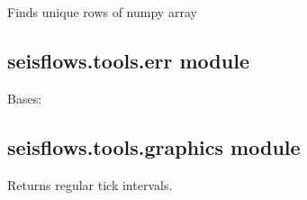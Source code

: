 \documentclass[letterpaper,10pt,english]{sphinxmanual}
\begin{document}
\begin{fulllineitems}
\label{\detokenize{ref/seisflows.tools:seisflows.tools.array.uniquerows}}
Finds unique rows of numpy array

\end{fulllineitems}



\subsection{seisflows.tools.err module}
\label{\detokenize{ref/seisflows.tools:module-seisflows.tools.err}}\label{\detokenize{ref/seisflows.tools:seisflows-tools-err-module}}

\begin{fulllineitems}
\label{\detokenize{ref/seisflows.tools:seisflows.tools.err.ParameterError}}
Bases: 

\end{fulllineitems}



\subsection{seisflows.tools.graphics module}
\label{\detokenize{ref/seisflows.tools:module-seisflows.tools.graphics}}\label{\detokenize{ref/seisflows.tools:seisflows-tools-graphics-module}}

\begin{fulllineitems}
\label{\detokenize{ref/seisflows.tools:seisflows.tools.graphics.get_regular_ticks}}
Returns regular tick intervals.

\end{fulllineitems}
\end{document}
